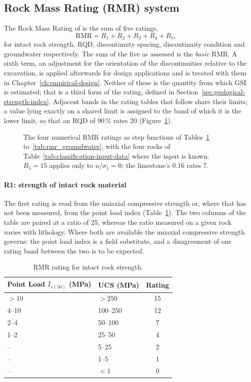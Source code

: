 \subsection{Rock Mass Rating (RMR) system}
\label{sec:rmr-system}

The Rock Mass Rating of \citet{bieniawski1989rmr} is the sum of five ratings,
\[
\text{RMR} = R_1 + R_2 + R_3 + R_4 + R_5 ,
\]
for intact rock strength, RQD, discontinuity spacing, discontinuity condition
and groundwater respectively. The sum of the five as assessed is the
\emph{basic} RMR. A sixth term, an adjustment for the orientation of the
discontinuities relative to the excavation, is applied afterwards for design
applications and is treated with them in Chapter~\ref{ch:empirical-design}.
Neither of these is the quantity from which GSI is estimated; that is a third
form of the rating, defined in Section~\ref{sec:geological-strength-index}.
Adjacent bands in the rating tables that follow share their limits; a value
lying exactly on a shared limit is assigned to the band of which it is the
lower limit, so that an RQD of 90\,\% rates 20
(Figure~\ref{fig:rmr-ratings}).

\begin{figure}[htbp]
\centering
{}
\caption{The four numerical RMR ratings as step functions of Tables~\ref{tab:rmr_strength} to~\ref{tab:rmr_groundwater}, with the four rocks of Table~\ref{tab:classification-input-data} where the input is known. $R_5 = 15$ applies only to $u/\sigma_1 = 0$; the limestone's 0.16 rates 7.}
\label{fig:rmr-ratings}
\end{figure}

\paragraph{R1: strength of intact rock material}
The first rating is read from the uniaxial compressive strength or, where that
has not been measured, from the point load index
(Table~\ref{tab:rmr_strength}). The two columns of the table are paired at a
ratio of 25, whereas the ratio measured on a given rock varies with lithology.
Where both are available the uniaxial compressive strength governs: the point
load index is a field substitute, and a disagreement of one rating band
between the two is to be expected.

\begin{table}[htbp]
\caption{RMR rating for intact rock strength.}
\label{tab:rmr_strength}
\centering
\small
\begin{tabular}{l l c}
\toprule
\textbf{Point Load \(I_{s(50)}\) (MPa)} & \textbf{UCS (MPa)} & \textbf{Rating} \\
\midrule
\(>10\) & \(>250\) & 15 \\
4--10 & 100--250 & 12 \\
2--4 & 50--100 & 7 \\
1--2 & 25--50 & 4 \\
-- & 5--25 & 2 \\
-- & 1--5 & 1 \\
-- & \(<1\) & 0 \\
\bottomrule
\end{tabular}
\end{table}

